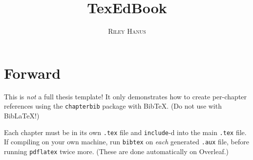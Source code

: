 \documentclass[11pt,oneside]{book}
\title{\Huge \textbf{TexEdBook}}
\author{\textsc{Riley Hanus}}
\begin{document}
\frontmatter
\maketitle

\chapter*{Forward}
This is \emph{not} a full thesis template! It only demonstrates how to create per-chapter references using the \texttt{chapterbib} package with BibTeX. (Do not use with BibLaTeX!)

Each chapter must be in its own \texttt{.tex} file and \texttt{include}-d into the main \texttt{.tex} file. If compiling on your own machine, run \texttt{bibtex} on \emph{each} generated \texttt{.aux} file, before running \texttt{pdflatex} twice more. (These are done automatically on Overleaf.)

\tableofcontents

\mainmatter





\backmatter

\end{document}
